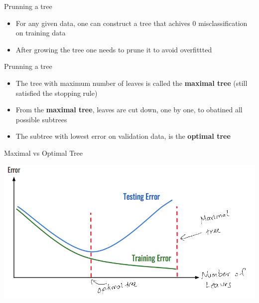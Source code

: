\documentclass[
  ignorenonframetext,
]{beamer}
\providecommand{\tightlist}{%
  \setlength{\itemsep}{0pt}\setlength{\parskip}{0pt}}
\begin{document}
\begin{frame}{Prunning a tree}
\protect\hypertarget{prunning-a-tree}{}

\begin{itemize}
\tightlist
\item
  For any given data, one can construct a tree that achives 0
  misclassification on training data
\item
  After growing the tree one needs to prune it to avoid overfittted
\end{itemize}

\end{frame}

\begin{frame}{Prunning a tree}
\protect\hypertarget{prunning-a-tree-1}{}

\begin{itemize}
\tightlist
\item
  The tree with maximum number of leaves is called the \textbf{maximal
  tree} (still satisfied the stopping rule)
\item
  From the \textbf{maximal tree}, leaves are cut down, one by one, to
  obatined all possible subtrees
\item
  The subtree with lowest error on validation data, is the
  \textbf{optimal tree}
\end{itemize}

\end{frame}

\begin{frame}{Maximal vs Optimal Tree}
\protect\hypertarget{maximal-vs-optimal-tree}{}

\includegraphics{images2/tree7.png}

\end{frame}
\end{document}
